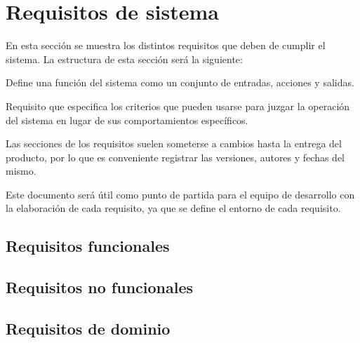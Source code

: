 \chapter{Requisitos de sistema}
    En esta sección se muestra los distintos requisitos que deben de cumplir el sistema. La estructura de esta sección será la siguiente:
    \begin{description}
        \item[Requisitos funcionales:]{Define una función del sistema como un conjunto de entradas, acciones y salidas.}
        \item[Requisitos no funcionales:]{Requisito que especifica los criterios que pueden usarse para juzgar la operación del sistema en lugar de sus comportamientos específicos.}
        \item
    \end{description}

    Las secciones de los requisitos suelen someterse a cambios hasta la entrega del producto, por lo que es conveniente registrar las versiones, autores y fechas del mismo.

    Este documento será útil como punto de partida para el equipo de desarrollo con la elaboración de cada requisito, ya que se define el entorno de cada requisito.

\section{Requisitos funcionales}
    

\section{Requisitos no funcionales}
    

\section{Requisitos de dominio}
    
